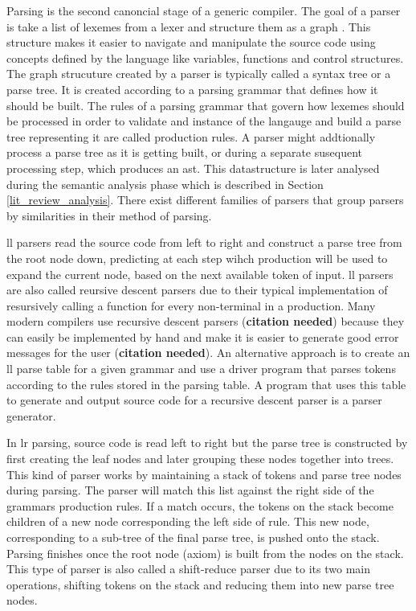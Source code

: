 Parsing is the second canoncial stage of a generic compiler. The goal of a
parser is take a list of lexemes from a lexer and structure them as a graph
\citep{scott_programming_2015}. This structure makes it easier to navigate
and manipulate the source code using concepts defined by the language like
variables, functions and control structures. The graph strucuture created
by a parser is typically called a syntax tree or a parse tree. It is created
according to a parsing grammar that defines how it should be built. The rules
of a parsing grammar that govern how lexemes should be processed in order to
validate and instance of the langauge and build a parse tree representing it are
called production rules. A parser might addtionally process a parse tree as it
is getting built, or during a separate susequent processing step, which produces
an \gls{ast}. This datastructure is later analysed during the semantic analysis
phase which is described in Section \ref{lit_review_analysis}. There exist
different families of parsers that group parsers by similarities in their method
of parsing.

\gls{ll} parsers read the source code from left to right and construct a
parse tree from the root node down, predicting at each step wihch production
will be used to expand the current node, based on the next available token of
input. \gls{ll} parsers are also called reursive descent parsers due to their
typical implementation of resursively calling a function for every non-terminal
in a production. Many modern compilers use recursive descent parsers
(\textbf{citation needed}) because they can easily be implemented by hand and
make it is easier to generate good error messages for the user (\textbf{citation
needed}). An alternative approach is to create an \gls{ll} parse table for a
given grammar and use a driver program that parses tokens according to the rules
stored in the parsing table. A program that uses this table to generate and
output source code for a recursive descent parser is a parser generator.

In \gls{lr} parsing, source code is read left to right but the parse tree is
constructed by first creating the leaf nodes and later grouping these nodes
together into trees. This kind of parser works by maintaining a stack of tokens
and parse tree nodes during parsing. The parser will match this list against
the right side of the grammars production rules. If a match occurs, the tokens
on the stack become children of a new node corresponding the left side of rule.
This new node, corresponding to a sub-tree of the final parse tree, is pushed
onto the stack. Parsing finishes once the root node (axiom) is built from the
nodes on the stack. This type of parser is also called a shift-reduce parser due
to its two main operations, shifting tokens on the stack and reducing them into
new parse tree nodes.


